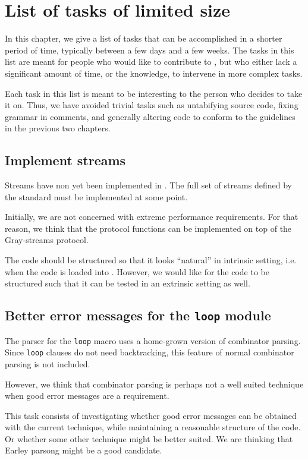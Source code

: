 \chapter{List of tasks of limited size}

In this chapter, we give a list of tasks that can be accomplished in a
shorter period of time, typically between a few days and a few weeks.
The tasks in this list are meant for people who would like to
contribute to \sysname{}, but who either lack a significant amount of
time, or the knowledge, to intervene in more complex tasks.

Each task in this list is meant to be interesting to the person who
decides to take it on.  Thus, we have avoided trivial tasks such as
untabifying source code, fixing grammar in comments, and generally
altering code to conform to the guidelines in the previous two
chapters.

\section{Implement streams}

Streams have non yet been implemented in \sysname{}.  The full set of
streams defined by the standard must be implemented at some point.

Initially, we are not concerned with extreme performance
requirements.  For that reason, we think that the protocol functions
can be implemented on top of the Gray-streams protocol.

The code should be structured so that it looks ``natural'' in
intrinsic setting, i.e. when the code is loaded into \sysname{}.
However, we would like for the code to be structured such that it can
be tested in an extrinsic setting as well.

\section{Better error messages for the \texttt{loop} module}

The parser for the \texttt{loop} macro uses a home-grown version of
combinator parsing.  Since \texttt{loop} clauses do not need
backtracking, this feature of normal combinator parsing is not
included.

However, we think that combinator parsing is perhaps not a well suited
technique when good error messages are a requirement.

This task consists of investigating whether good error messages can be
obtained with the current technique, while maintaining a reasonable
structure of the code.  Or whether some other technique might be
better suited.  We are thinking that Earley parsong might be a good
candidate.
